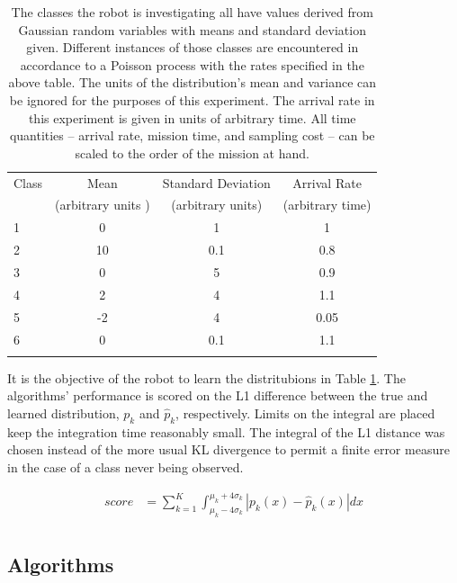 \begin{table}[htpd!]
	\centering
	\begin{tabular}{l|ccc}
		Class & Mean & Standard Deviation & Arrival Rate\\
							 & (arbitrary units )  & (arbitrary units) & (arbitrary time)\\
 		\hline
		1 & 0 & 1 & 1\\
		2 & 10 & 0.1 & 0.8 \\
		3 & 0 & 5 & 0.9\\
		4 & 2 & 4 & 1.1\\
		5 & -2 & 4 & 0.05\\
		6 & 0 & 0.1 & 1.1\\
		\hline 
		\\
	\end{tabular}
	\caption{The classes the robot is investigating all have values derived from Gaussian random variables with means and standard deviation given.  Different instances of those classes are encountered in accordance to a Poisson process with the rates specified in the above table.  The units of the distribution's mean and variance can be ignored for the purposes of this experiment.  The arrival rate in this experiment is given in units of arbitrary time.  All time quantities -- arrival rate, mission time, and sampling cost -- can be scaled to the order of the mission at hand.}
	\label{tbl:classes}
\end{table}

It is the objective of the robot to learn the distritubions in Table \ref{tbl:classes}.  The algorithms' performance is scored on the L1 difference between the true and learned distribution, $p_k$ and $\hat{p}_k$, respectively.  Limits on the integral are placed keep the integration time reasonably small.  The integral of the L1 distance was chosen instead of the more usual KL divergence to permit a finite error measure in the case of a class never being observed.

\begin{align*}
	score &= \sum_{k=1}^{K} \int_{\mu_{k}-4\sigma_{k}}^{\mu_{k}+4\sigma_{k}} \left| p_{k}(x) - \hat{p}_{k}(x)\right| dx\\
\end{align*}

\subsection{Algorithms}



